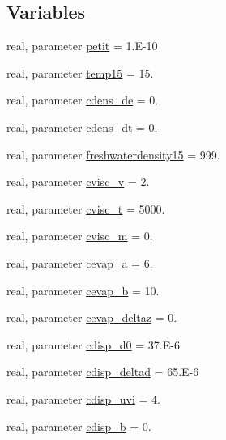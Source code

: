 \subsection*{Variables}
\begin{DoxyCompactItemize}
\item 
real, parameter \mbox{\hyperlink{namespacemoduleoil__0d_a547127552891b3c14b9a17bb1f717386}{petit}} = 1.\+E-\/10
\item 
real, parameter \mbox{\hyperlink{namespacemoduleoil__0d_abf4265993041d7eaab8c8c078c27e3b4}{temp15}} = 15.
\item 
real, parameter \mbox{\hyperlink{namespacemoduleoil__0d_aa8e32147ad54c70f37e2e8b127e6e145}{cdens\+\_\+de}} = 0.
\item 
real, parameter \mbox{\hyperlink{namespacemoduleoil__0d_a02c6c26069ce4f0c05a7b9b59479fb2b}{cdens\+\_\+dt}} = 0.
\item 
real, parameter \mbox{\hyperlink{namespacemoduleoil__0d_a0433cc793bc0b14d9eca3691e04c30e7}{freshwaterdensity15}} = 999.
\item 
real, parameter \mbox{\hyperlink{namespacemoduleoil__0d_acfacd3adca2fee1b77701377a603ecff}{cvisc\+\_\+v}} = 2.
\item 
real, parameter \mbox{\hyperlink{namespacemoduleoil__0d_a76d0bac579178545a0803fac44896e05}{cvisc\+\_\+t}} = 5000.
\item 
real, parameter \mbox{\hyperlink{namespacemoduleoil__0d_a5d1220b3aab88a0e344bb8c0fffd71a3}{cvisc\+\_\+m}} = 0.
\item 
real, parameter \mbox{\hyperlink{namespacemoduleoil__0d_abe2021f4baaab1a74a16f3d57bb50a11}{cevap\+\_\+a}} = 6.
\item 
real, parameter \mbox{\hyperlink{namespacemoduleoil__0d_aadd06c64182eb7a763a5e757ff385c25}{cevap\+\_\+b}} = 10.
\item 
real, parameter \mbox{\hyperlink{namespacemoduleoil__0d_a31c60df762b057d952f871b7b2c116fa}{cevap\+\_\+deltaz}} = 0.
\item 
real, parameter \mbox{\hyperlink{namespacemoduleoil__0d_ae1d966eb0d636236bb46e1077d70e0f4}{cdisp\+\_\+d0}} = 37.\+E-\/6
\item 
real, parameter \mbox{\hyperlink{namespacemoduleoil__0d_a37051aa74023c2eb92aa1703a387949f}{cdisp\+\_\+deltad}} = 65.\+E-\/6
\item 
real, parameter \mbox{\hyperlink{namespacemoduleoil__0d_a2ffff41b9d63e745753555b0be9d11be}{cdisp\+\_\+uvi}} = 4.
\item 
real, parameter \mbox{\hyperlink{namespacemoduleoil__0d_aa093e8de7aa1551ad61da7016758c1cf}{cdisp\+\_\+b}} = 0.

\end{DoxyCompactItemize}
